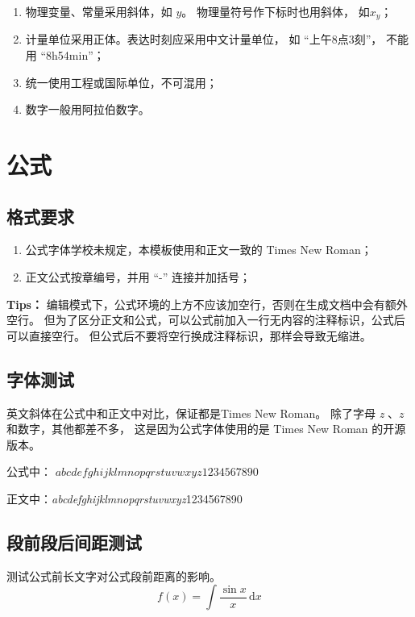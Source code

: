 \documentclass{swputhesis}
\begin{document}
\begin{enumerate}
	\item 物理变量、常量采用斜体，如 $y$。 物理量符号作下标时也用斜体， 如$x_y$；
	\item 计量单位采用正体。表达时刻应采用中文计量单位，
				如 ``上午8点3刻''， 不能用 ``8h54min''；
	\item 统一使用工程或国际单位，不可混用；
	\item 数字一般用阿拉伯数字。
\end{enumerate}

\section{公式}

\subsection{格式要求}

\begin{enumerate}
	\item 公式字体学校未规定，本模板使用和正文一致的 Times New Roman；
	\item 正文公式按章编号，并用 ``-'' 连接并加括号；
\end{enumerate}

\textbf{Tips：} 编辑模式下，公式环境的上方不应该加空行，否则在生成文档中会有额外空行。
但为了区分正文和公式，可以公式前加入一行无内容的注释标识，公式后可以直接空行。
但公式后不要将空行换成注释标识，那样会导致无缩进。

\subsection{字体测试}

英文斜体在公式中和正文中对比，保证都是Times New Roman。
除了字母 \textit{z} 、$z$和数字，其他都差不多，
这是因为公式字体使用的是 Times New Roman 的开源版本。

公式中： $abcdefghijklmnopqrstuvwxyz1234567890$

正文中：\textit{abcdefghijklmnopqrstuvwxyz}1234567890

\subsection{段前段后间距测试}

测试公式前长文字对公式段前距离的影响。
%
\begin{equation}  \label{eq:a}
	f(x) = \int\frac{\sin x}{x}\,\mathrm{d}x
\end{equation}
\end{document}
